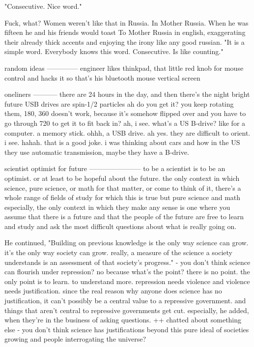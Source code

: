 "Consecutive. Nice word." 

Fuck, what? Women weren't like that in Russia. In Mother Russia. When he was fifteen he and his friends would toast To Mother Russia in english, exaggerating their already thick accents and enjoying the irony like any good russian. "It is a simple word. Everybody knows this word. Consecutive. Is like counting."

random ideas
--------------
 engineer likes thinkpad, that little red knob for mouse control and hacks it so that's his bluetooth mouse
 vertical screen
 


oneliners
-----------
there are 24 hours in the day, and then there's the night
bright future
USB drives are spin-1/2 particles 
 ah
 do you get it? you keep rotating them, 180, 360 doesn't work, because it's somehow flipped over and you have to go through 720 to get it to fit back in?
 ah, i see. what's a US B-drive?
 like for a computer. a memory stick.
 ohhh, a USB drive. ah yes. they are difficult to orient. i see. hahah. that is a good joke. i was thinking about cars and how in the US they use automatic transmission, maybe they have a B-drive. 


scientist optimist for future
-----------------------
to be a scientist is to be an optimist. or at least to be hopeful about the future. the only context in which science, pure science, or math for that matter, or come to think of it, there's a whole range of fields of study for which this is true but pure science and math especially, the only context in which they make any sense is one where you assume that there is a future and that the people of the future are free to learn and study and ask the most difficult questions about what is really going on. 

He continued, "Building on previous knowledge is the only way science can grow. it's the only way society can grow. really, a measure of the science a society understands is an assessment of that society's progress." 
 - you don't think science can flourish under repression?
no because what's the point? there is no point. the only point is to learn. to understand more. repression needs violence and violence needs justification. since the real reason why anyone does science has no justification, it can't possibly be a central value to a repressive government. and things that aren't central to repressive governments get cut. especially, he added, when they're in the business of asking questions. 
 ++ chatted about something else
 - you don't think science has justifications beyond this pure ideal of societies growing and people interrogating the universe? 




